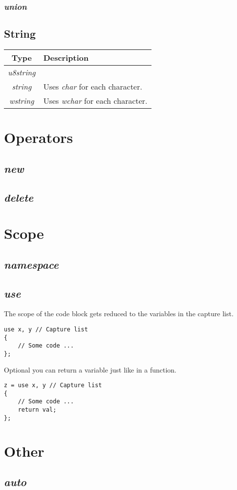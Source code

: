 \documentclass[10pt,a4paper]{article}
\begin{document}
\subsubsection{\textit{union}}


\subsection{String}
\begin{tabular}{c|l}
Type				& Description\\ \hline \hline
\textit{u8string}	&  \\
\textit{string}		& Uses \textit{char} for each character. \\ \hline

\textit{wstring}	& Uses \textit{wchar} for each character. \\
\end{tabular}




\section{Operators}


\subsection{\textit{new}}


\subsection{\textit{delete}}




\section{Scope}


\subsection{\textit{namespace}}


\subsection{\textit{use}}
The scope of the code block gets reduced to the variables in the capture list.
\begin{lstlisting}
use x, y // Capture list
{
	// Some code ...
};
\end{lstlisting}
Optional you can return a variable just like in a function.
\begin{lstlisting}
z = use x, y // Capture list
{
	// Some code ...
	return val;
};
\end{lstlisting}




\section{Other}


\subsection{\textit{auto}}
\end{document}
